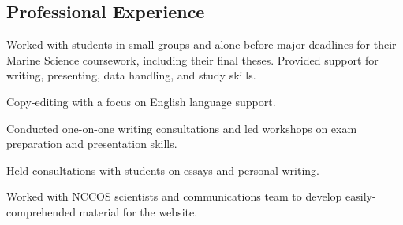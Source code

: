 \documentclass[a4paper]{deedy-resume} %
\begin{document}
\begin{flushleft}


\section{Professional Experience}



Worked with students in small groups and alone before major deadlines for their Marine Science coursework, including their final theses. Provided support for writing, presenting, data handling, and study skills.

\sectionspace



Copy-editing with a focus on English language support.

\sectionspace



Conducted one-on-one writing consultations and led workshops on exam preparation and presentation skills.

\sectionspace %



Held consultations with students on essays and personal writing.

\sectionspace %



Worked with NCCOS scientists and communications team to develop easily-comprehended material for the website.


\end{flushleft}
\end{document}
